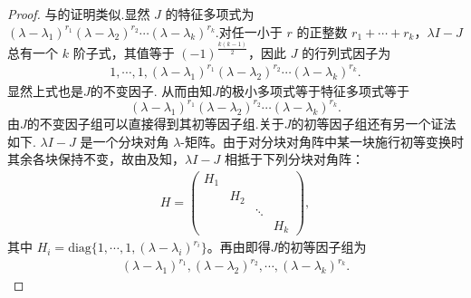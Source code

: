 \documentclass[../../main.tex]{subfiles}
\begin{document}
\begin{proof}
与的证明类似.显然 $J$ 的特征多项式为 $(\lambda - \lambda_1)^{r_1}(\lambda - \lambda_2)^{r_2}\cdots(\lambda - \lambda_k)^{r_k}.$对任一小于 $r$ 的正整数 $r_1+\cdots+r_k$，$\lambda I - J$ 总有一个 $k$ 阶子式，其值等于 $(-1)^{\frac{k(k-1)}{2}}$，因此 $J$ 的行列式因子为
\begin{align*}
1,\cdots,1,(\lambda - \lambda_1)^{r_1}(\lambda - \lambda_2)^{r_2}\cdots(\lambda - \lambda_k)^{r_k}.
\end{align*}
显然上式也是$J$的不变因子.
从而由知$J$的极小多项式等于特征多项式等于
$$
(\lambda - \lambda_1)^{r_1}(\lambda - \lambda_2)^{r_2}\cdots(\lambda - \lambda_k)^{r_k}.
$$
由$J$的不变因子组可以直接得到其初等因子组.关于$J$的初等因子组还有另一个证法如下.
$\lambda I - J$ 是一个分块对角 $\lambda$-矩阵。由于对分块对角阵中某一块施行初等变换时其余各块保持不变，故由及知，$\lambda I - J$ 相抵于下列分块对角阵：
\begin{align*}
H = \begin{pmatrix}
H_1 & & & \\
& H_2 & & \\
& & \ddots & \\
& & & H_k
\end{pmatrix},
\end{align*}
其中 $H_i = \mathrm{diag}\{1,\cdots,1,(\lambda - \lambda_i)^{r_i}\}$。再由即得$J$的初等因子组为
\begin{align*}
(\lambda - \lambda_1)^{r_1}, (\lambda - \lambda_2)^{r_2}, \cdots, (\lambda - \lambda_k)^{r_k}.
\end{align*}

\end{proof}
\end{document}
